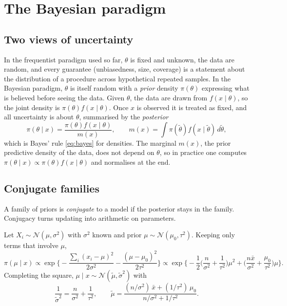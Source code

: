 \documentclass[11pt,a4paper]{article}
\newcommand{\N}{\mathcal{N}}
\begin{document}
\section{The Bayesian paradigm}\label{sec:bayes}

\subsection{Two views of uncertainty}

In the frequentist paradigm used so far, $\theta$ is fixed and unknown, the data are random, and every guarantee (unbiasedness, size, coverage) is a statement about the distribution of a procedure across hypothetical repeated samples. In the Bayesian paradigm, $\theta$ is itself random with a \emph{prior} density $\pi(\theta)$ expressing what is believed before seeing the data. Given $\theta$, the data are drawn from $f(x\mid\theta)$, so the joint density is $\pi(\theta)f(x\mid\theta)$. Once $x$ is observed it is treated as fixed, and all uncertainty is about $\theta$, summarised by the \emph{posterior}
\[
\pi(\theta\mid x)=\frac{\pi(\theta)f(x\mid\theta)}{m(x)},\qquad m(x)=\int\pi(\tilde\theta)f(x\mid\tilde\theta)\,d\tilde\theta,
\]
which is Bayes' rule \eqref{eq:bayes} for densities. The marginal $m(x)$, the prior predictive density of the data, does not depend on $\theta$, so in practice one computes $\pi(\theta\mid x)\propto\pi(\theta)f(x\mid\theta)$ and normalises at the end.

\subsection{Conjugate families}\label{sec:conj}

A family of priors is \emph{conjugate} to a model if the posterior stays in the family. Conjugacy turns updating into arithmetic on parameters.

\begin{example}\label{ex:normalprior}
Let $X_i\sim\N(\mu,\sigma^2)$ with $\sigma^2$ known and prior $\mu\sim\N(\mu_0,\tau^2)$. Keeping only terms that involve $\mu$,
\[
\pi(\mu\mid x)\propto\exp\Big\{-\frac{\sum_i(x_i-\mu)^2}{2\sigma^2}-\frac{(\mu-\mu_0)^2}{2\tau^2}\Big\}
\propto\exp\Big\{-\frac12\Big(\frac{n}{\sigma^2}+\frac1{\tau^2}\Big)\mu^2+\Big(\frac{n\bar x}{\sigma^2}+\frac{\mu_0}{\tau^2}\Big)\mu\Big\}.
\]
Completing the square, $\mu\mid x\sim\N(\tilde\mu,\tilde\sigma^2)$ with
\[
\frac1{\tilde\sigma^2}=\frac{n}{\sigma^2}+\frac1{\tau^2},\qquad
\tilde\mu=\frac{(n/\sigma^2)\,\bar x+(1/\tau^2)\,\mu_0}{n/\sigma^2+1/\tau^2}.
\]
\end{example}
\end{document}
